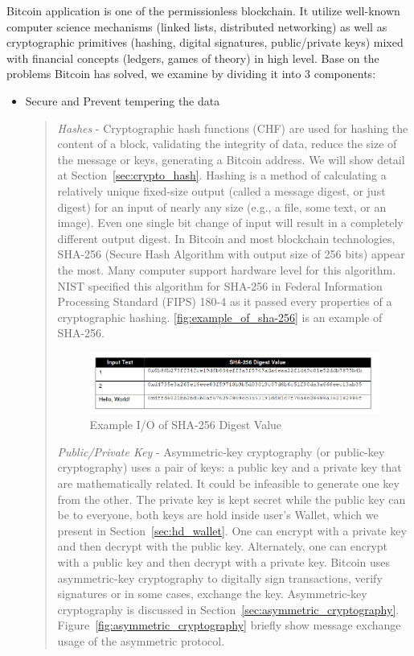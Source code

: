Bitcoin application is one of the permissionless blockchain.
It utilize well-known computer science mechanisms (linked lists, distributed networking) as well as cryptographic primitives (hashing, digital signatures, public/private keys) mixed with financial concepts (ledgers, games of theory) in high level. 
Base on the problems Bitcoin has solved, we examine by dividing it into 3 components:

\begin{itemize}
\item Secure and Prevent tempering the data

\begin{quote} 
	\emph{Hashes} - 
	Cryptographic hash functions (CHF) are used for hashing the content of a block, validating the integrity of data, reduce the size of the message or keys, generating a Bitcoin address. We will show detail at Section~\ref{sec:crypto_hash}.
	Hashing is a method of calculating a relatively unique fixed-size output (called a message digest, or just digest) for an input of nearly any size (e.g., a file, some text, or an image).
	Even one single bit change of input will result in a completely different output digest. 
	In Bitcoin and most blockchain technologies, SHA-256 (Secure Hash Algorithm with output size of 256 bits) appear the most. Many computer support hardware level for this algorithm.
	NIST specified this algorithm for SHA-256 in Federal Information Processing Standard (FIPS) 180-4 as it passed every properties of a cryptographic hashing.
	\autoref{fig:example_of_sha-256} is an example of SHA-256.

		\begin{figure}[h!]
			\centering
			\includegraphics[width=1\textwidth]{images/example_of_sha-256.png}
			\caption[Example input and output of SHA-256 Digest Value]{Example I/O of SHA-256 Digest Value}
			\label{fig:example_of_sha-256}
		\end{figure}

	\bigbreak
	
	\emph{Public/Private Key} -	
	Asymmetric-key cryptography (or public-key cryptography) uses a pair of keys: a public key and a private key that are mathematically related. It could be infeasible to generate one key from the other.
	The private key is kept secret while the public key can be to everyone, both keys are hold inside user's Wallet, which we present in Section~\ref{sec:hd_wallet}.
	One can encrypt with a private key and then decrypt with the public key. 
	Alternately, one can encrypt with a public key and then decrypt with a private key.
	Bitcoin uses asymmetric-key cryptography to digitally sign transactions, verify signatures or in some cases, exchange the key.
	Asymmetric-key cryptography is discussed in Section~\ref{sec:asymmetric_cryptography}.
	Figure~\ref{fig:asymmetric_cryptography} briefly show message exchange usage of the asymmetric protocol.
	

\end{quote}
\end{itemize}
